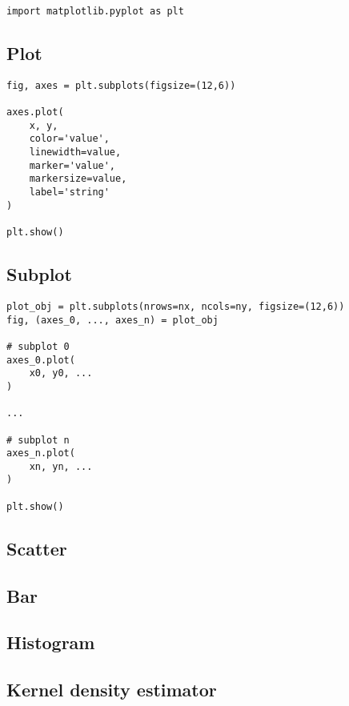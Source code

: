 \begin{verbatim}
import matplotlib.pyplot as plt
\end{verbatim}


\subsection{Plot}

\begin{verbatim}
fig, axes = plt.subplots(figsize=(12,6))

axes.plot(
    x, y, 
    color='value', 
    linewidth=value,
    marker='value', 
    markersize=value, 
    label='string'
)

plt.show()
\end{verbatim}


\subsection{Subplot}

\begin{verbatim}
plot_obj = plt.subplots(nrows=nx, ncols=ny, figsize=(12,6))
fig, (axes_0, ..., axes_n) = plot_obj

# subplot 0
axes_0.plot(
    x0, y0, ...
)

...

# subplot n
axes_n.plot(
    xn, yn, ...
)

plt.show()
\end{verbatim}


\subsection{Scatter}
    
\subsection{Bar}

\subsection{Histogram}

\subsection{Kernel density estimator}

